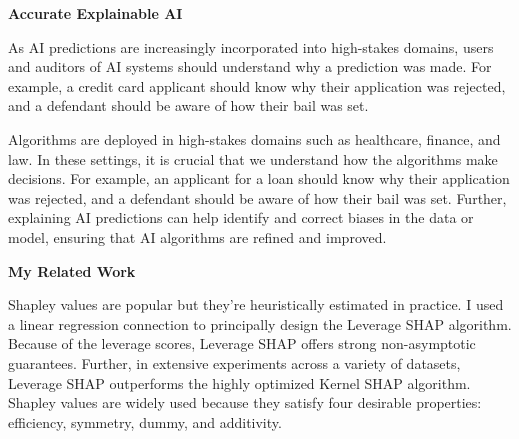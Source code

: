 \documentclass[11pt]{article}
\begin{document}
{%
%

\begin{center}
{ \large \textbf{Accurate Explainable AI}}
\end{center}

As AI predictions are increasingly incorporated into high-stakes domains, users and auditors of AI systems should understand why a prediction was made. For example, a credit card applicant should know why their application was rejected, and a defendant should be aware of how their bail was set. 

Algorithms are deployed in high-stakes domains such as healthcare, finance, and law.
In these settings, it is crucial that we understand how the algorithms make decisions.
For example, an applicant for a loan should know why their application was rejected, and a defendant should be aware of how their bail was set.
Further, explaining AI predictions can help identify and correct biases in the data or model, ensuring that AI algorithms are refined and improved.


{ \large \textbf{My Related Work}}

Shapley values are popular but they're heuristically estimated in practice.
I used a linear regression connection to principally design the Leverage SHAP algorithm.
Because of the leverage scores, Leverage SHAP offers strong non-asymptotic guarantees.
Further, in extensive experiments across a variety of datasets, Leverage SHAP outperforms the highly optimized Kernel SHAP algorithm.
Shapley values are widely used because they satisfy four desirable properties: efficiency, symmetry, dummy, and additivity.

}
\end{document}
